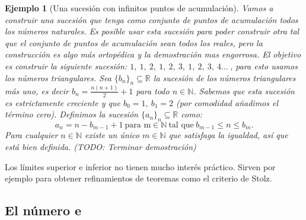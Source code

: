 \documentclass{article}
\newtheorem{ejem}{Ejemplo}
\newcommand{\reales}{\mathbb{R}}
\newcommand{\naturales}{\mathbb{N}}
\newcommand{\sucreal}[1]{\{ #1 _n \}_n \subseteq \reales}
\begin{document}
\begin{ejem}[Una sucesión con infinitos puntos de acumulación]
	Vamos a construir una sucesión que tenga como conjunto de puntos de acumulación todos los números naturales. Es posible usar esta sucesión para poder construir otra tal que el conjunto de puntos de acumulación sean todos los reales, pero la construcción es algo más ortopédica y la demostración mas engorrosa.
	El objetivo es construir la siguiente sucesión: $1,\ 1,\ 2,\ 1,\ 2,\ 3,\ 1,\ 2,\ 3,\ 4 \ldots\ $, para esto usamos los números triangulares.
	Sea $\sucreal{b}$ la sucesión de los números triangulares más uno, es decir $b_n = \frac{n(n+1)}{2} + 1$ para todo $n \in \naturales$. Sabemos que esta sucesión es estrictamente creciente y que $b_0 = 1,\ b_1 = 2$ (por comodidad añadimos el término cero). Definimos la sucesión $\sucreal{a}$ como:
	\begin{equation*}
		a_n = n - b_{m-1} + 1\ \text{para m} \in \naturales\ \text{tal que}\ b_{m-1} \leq n \leq b_m \text{.}
	\end{equation*}
	Para cualquier $n \in \naturales$ existe un único $m \in \naturales$ que satisfaga la igualdad, así que está bien definida. (TODO: Terminar demostración)
\end{ejem}

Los límites superior e inferior no tienen mucho interés práctico. Sirven por ejemplo para obtener refinamientos de teoremas como el criterio de Stolz.

\subsection{El número e}
\end{document}
